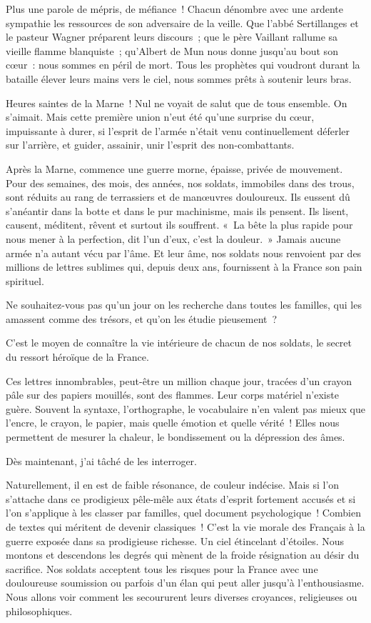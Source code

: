 \documentclass[french,twoside]{book} %
\begin{document}
Plus une parole de mépris, de méfiance ! Chacun dénombre avec une ardente sympathie les ressources de son adversaire de la veille. Que l’abbé Sertillanges et le pasteur Wagner préparent leurs discours ; que le père Vaillant rallume sa vieille flamme blanquiste ; qu’Albert de Mun nous donne jusqu’au bout son cœur : nous sommes en péril de mort. Tous les prophètes qui voudront durant la bataille élever leurs mains vers le ciel, nous sommes prêts à soutenir leurs bras.‌\par
Heures saintes de la Marne ! Nul ne voyait de salut que de tous ensemble. On s’aimait. Mais cette première union n’eut été qu’une surprise du cœur, impuissante à durer, si l’esprit de l’armée n’était venu continuellement déferler sur l’arrière, et guider, assainir, unir l’esprit des non-combattants.‌\par
Après la Marne, commence une guerre morne, épaisse, privée de mouvement. Pour des semaines, des mois, des années, nos soldats, immobiles dans des trous, sont réduits au rang de terrassiers et de manœuvres douloureux. Ils eussent dû s’anéantir dans la botte et dans le pur machinisme, mais ils pensent. Ils lisent, causent, méditent, rêvent et surtout ils souffrent. « La bête la plus rapide pour nous mener à la perfection, dit l’un d’eux, c’est la douleur. » Jamais aucune armée n’a autant vécu par l’âme. Et leur âme, nos soldats nous renvoient par des millions de lettres sublimes qui, depuis deux ans, fournissent à la France son pain spirituel.\par
Ne souhaitez-vous pas qu’un jour on les recherche dans toutes les familles, qui les amassent comme des trésors, et qu’on les étudie pieusement ?‌\par
C’est le moyen de connaître la vie intérieure de chacun de nos soldats, le secret du ressort héroïque de la France.‌\par
Ces lettres innombrables, peut-être un million chaque jour, tracées d’un crayon pâle sur des papiers mouillés, sont des flammes. Leur corps matériel n’existe guère. Souvent la syntaxe, l’orthographe, le vocabulaire n’en valent pas mieux que l’encre, le crayon, le papier, mais quelle émotion et quelle vérité ! Elles nous permettent de mesurer la chaleur, le bondissement ou la dépression des âmes.‌\par
Dès maintenant, j’ai tâché de les interroger.‌\par
Naturellement, il en est de faible résonance, de couleur indécise. Mais si l’on s’attache dans ce prodigieux pêle-mêle aux états d’esprit fortement accusés et si l’on s’applique à les classer par familles, quel document psychologique ! Combien de textes qui méritent de devenir classiques ! C’est la vie morale des Français à la guerre exposée dans sa prodigieuse richesse. Un ciel étincelant d’étoiles. Nous montons et descendons les degrés qui mènent de la froide résignation au désir du sacrifice. Nos soldats acceptent tous les risques pour la France avec une douloureuse soumission ou parfois d’un élan qui peut aller jusqu’à l’enthousiasme. Nous allons voir comment les secoururent leurs diverses croyances, religieuses ou philosophiques.‌\par
\end{document}
